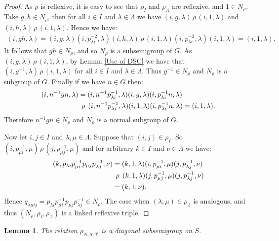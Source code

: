 \documentclass[a4paper, 12pt,reqno]{amsart}
\theoremstyle{plain}
\newtheorem{lemma}[thm]{Lemma}
\theoremstyle{definition}
\theoremstyle{remark}
\newcommand{\normspace}[1]{\, #1 \,}
\newcommand{\bigspace}[1]{\hspace{4.5pt} #1 \hspace{4.5pt}}
\begin{document}
\begin{proof}
    As $\rho$ is reflexive, it is easy to see that $\rho_I$ and $\rho_\Lambda$ are reflexive, and $1 \in N_\rho$.
    Take $g , h \in N_\rho$, then for all $i \in I$ and $\lambda \in \Lambda$ we have $(i,g,\lambda) \normspace{\rho}(i,1,\lambda)$ and $(i,h,\lambda) \normspace{\rho} (i,1,\lambda)$.
    Hence we have:
    \begin{align*}
        (i,gh,\lambda) = (i,g,\lambda) (i,p_{\lambda i}^{-2},\lambda) (i,h,\lambda) \normspace{\rho} (i,1,\lambda) (i,p_{\lambda i}^{-2},\lambda) (i,1,\lambda) = (i,1 , \lambda).
    \end{align*}
    It follows that $gh \in N_\rho$, and so $N_\rho$ is a subsemigroup of $G$.
    As $(i,g,\lambda) \normspace{\rho} (i,1,\lambda)$, by Lemma \ref{Use of DSC} we have that $(i,g^{-1},\lambda) \normspace{\rho} (i,1,\lambda)$ for all $i \in I$ and $\lambda \in \Lambda$.
    Thus $g^{-1} \in N_\rho$ and $N_\rho$ is a subgroup of $G$.
    Finally if we have $n \in G$ then:
    \begin{align*}
        (i,n^{-1}gn,\lambda) & = (i,n^{-1}p_{\lambda i}^{-1},\lambda)(i,g,\lambda)(i,p_{\lambda i}^{-1}n,\lambda) \\
        &\bigspace{\rho} (i,n^{-1}p_{\lambda i}^{-1},\lambda)(i,1,\lambda)(i,p_{\lambda i}^{-1}n,\lambda) = (i,1,\lambda).
    \end{align*}
    Therefore $n^{-1}gn \in N_\rho$ and $N_\rho$ is a normal subgroup of $G$.

    Now let $i,j \in I$ and $\lambda,\mu \in \Lambda$.
    Suppose that $(i,j) \in \rho_I$.
    So $(i,p_{\mu i}^{-1} , \mu) \normspace{\rho} (j,p_{\mu j}^{-1} , \mu)$ and for arbitrary $k \in I$ and $\nu \in \Lambda$ we have:
    \begin{align*}
        (k,p_{\lambda i}p_{\mu i}^{-1} p_{\mu j} p_{\lambda j}^{-1} , \nu) & = (k,1,\lambda)(i,p_{\mu i}^{-1},\mu)(j,p_{\lambda j}^{-1},\nu) \\
        & \bigspace{\rho} (k,1,\lambda)(j,p_{\mu j}^{-1},\mu)(j,p_{\lambda j}^{-1},\nu) \\
        & = (k,1,\nu).
    \end{align*}
    Hence $q_{\lambda \mu i j} = p_{\lambda i}p_{\mu i}^{-1} p_{\mu j} p_{\lambda j}^{-1} \in N_\rho$.
    The case when $(\lambda,\mu) \in \rho_\Lambda$ is analogous, and thus 
    $(N_\rho , \rho_I , \rho_\Lambda)$ is a linked reflexive triple.
\end{proof}

\begin{lemma}
    \label{linked gives diagsubsemi}
    The relation $\rho_{N ,\mathcal{S},\mathcal{T}}$ is a diagonal subsemigroup on $S$.
\end{lemma}
\end{document}
